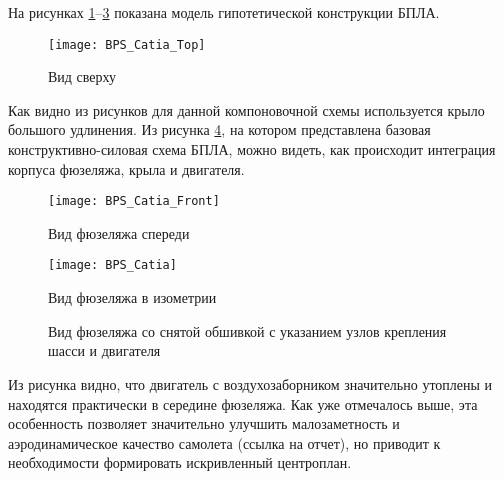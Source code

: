 На рисунках 
\ref{fig:BPS_Catia_Top}--\ref{fig:BPS_Catia} показана модель гипотетической конструкции БПЛА.


\begin{figure}[H]
\centering
\texttt{[image: BPS\_Catia\_Top]}
\caption{Вид сверху}
\label{fig:BPS_Catia_Top}
\end{figure}

Как видно из рисунков для данной компоновочной схемы используется крыло большого удлинения. Из рисунка \ref{fig:BPS_Catia_WithoutSkin}, на котором представлена базовая конструктивно-силовая схема БПЛА, можно видеть, как происходит интеграция корпуса фюзеляжа, крыла и двигателя. 

\begin{figure}[H]
\centering
\texttt{[image: BPS\_Catia\_Front]}
\caption{Вид фюзеляжа спереди}
\label{fig:BPS_Catia_Front}
\end{figure}




\begin{figure}[H]
\centering
\texttt{[image: BPS\_Catia]}
\caption{Вид фюзеляжа в изометрии}
\label{fig:BPS_Catia}
\end{figure}


\begin{figure}[H]
\centering
\def\svgwidth{0.9\textwidth}

\caption{Вид фюзеляжа со снятой обшивкой с указанием узлов крепления шасси и двигателя}
\label{fig:BPS_Catia_WithoutSkin}
\end{figure}

Из рисунка видно, что двигатель с воздухозаборником значительно утоплены и находятся практически в середине фюзеляжа. Как уже отмечалось выше, эта особенность позволяет значительно улучшить малозаметность и аэродинамическое качество самолета (ссылка на отчет), но приводит к необходимости формировать искривленный центроплан. 

